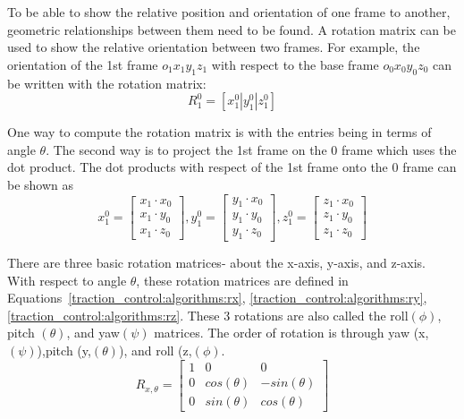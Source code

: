 To be able to show the relative position and orientation of one frame to another, geometric relationships between them need to be found. A rotation matrix can be used to show the relative orientation between two frames. For example, the orientation of the 1st frame $o_{1}x_{1}y_{1}z_{1}$ with respect to the base frame $o_{0}x_{0}y_{0}z_{0}$ can be written with the rotation matrix:
\begin{equation}\label{traction_control:algorithms:r01}
	R^{0}_{1} = [x^{0}_{1} | y^{0}_{1} | z^{0}_{1}]
\end{equation}

One way to compute the rotation matrix is with the entries being in terms of angle $\theta$. The second way is to project the 1st frame on the 0 frame which uses the dot product.  The dot products with respect of the 1st frame onto the 0 frame can be shown as
\begin{equation}
	x^{0}_{1} = \left[\begin{array}{c}
				x_{1}\cdot x_{0} \\
			    x_{1}\cdot y_{0} \\
			    x_{1}\cdot z_{0}
				\end{array} \right],
	y^{0}_{1} = \left[\begin{array}{c}
				y_{1}\cdot x_{0} \\
				y_{1}\cdot y_{0} \\
				y_{1}\cdot z_{0}
	\end{array} \right],
	z^{0}_{1} = \left[\begin{array}{c}
				z_{1}\cdot x_{0} \\
				z_{1}\cdot y_{0} \\
				z_{1}\cdot z_{0}
	\end{array} \right]
\end{equation}

There are three basic rotation matrices- about the x-axis, y-axis, and z-axis. With respect to angle $\theta$, these rotation matrices are defined in
Equations~\ref{traction_control:algorithms:rx}, \ref{traction_control:algorithms:ry}, \ref{traction_control:algorithms:rz}. 
These 3 rotations are also called the roll$(\phi)$, pitch $(\theta)$, and yaw$(\psi)$ matrices. The order of rotation is through yaw (x,$(\psi)$),pitch (y,$(\theta)$), and roll (z,$(\phi)$. \\

\begin{equation}
	R_{x,\theta} = \left[\begin{array}{ccc}
				1 & 0 & 0 \\
				0 & cos(\theta) & -sin(\theta)  \\
				0 & sin(\theta) & cos(\theta) 
				\end{array}\right]
	\label{traction_control:algorithms:rx}
\end{equation}


